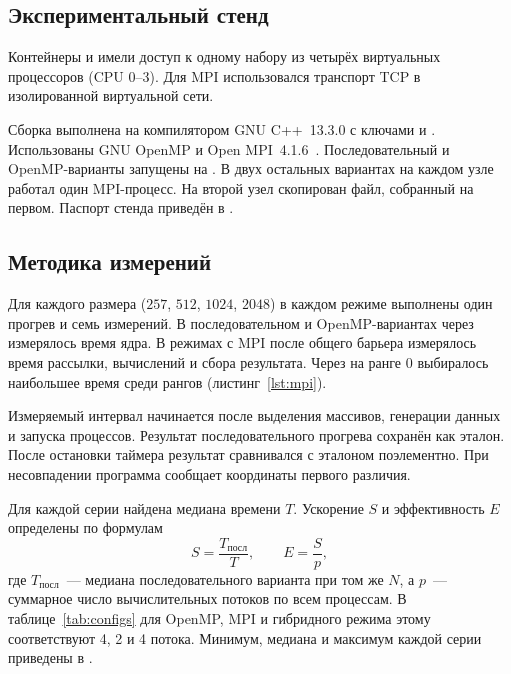 \clearpage
\subsection{Экспериментальный стенд}

Контейнеры  и  имели доступ к одному набору из четырёх виртуальных процессоров (CPU 0--3). Для MPI использовался транспорт TCP в изолированной виртуальной сети.

Сборка выполнена на  компилятором GNU C++~13.3.0 с ключами  и . Использованы GNU OpenMP и Open MPI~4.1.6~\cite{ompi}. Последовательный и OpenMP-варианты запущены на . В двух остальных вариантах на каждом узле работал один MPI-процесс. На второй узел скопирован файл, собранный на первом. Паспорт стенда приведён в .

\subsection{Методика измерений}

Для каждого размера ($257$, $512$, $1024$, $2048$) в каждом режиме выполнены один прогрев и семь измерений. В последовательном и OpenMP-вариантах через  измерялось время ядра. В режимах с MPI после общего барьера измерялось время рассылки, вычислений и сбора результата. Через  на ранге 0 выбиралось наибольшее время среди рангов (листинг~\ref{lst:mpi}).

Измеряемый интервал начинается после выделения массивов, генерации данных и запуска процессов. Результат последовательного прогрева сохранён как эталон. После остановки таймера результат сравнивался с эталоном поэлементно. При несовпадении программа сообщает координаты первого различия.

Для каждой серии найдена медиана времени $T$. Ускорение $S$ и эффективность $E$ определены по формулам
\begin{equation}
S=\frac{T_{\text{посл}}}{T},\qquad E=\frac{S}{p},
\label{eq:metrics}
\end{equation}
где $T_{\text{посл}}$~--- медиана последовательного варианта при том же $N$, а $p$~--- суммарное число вычислительных потоков по всем процессам. В таблице~\ref{tab:configs} для OpenMP, MPI и гибридного режима этому соответствуют 4, 2 и 4 потока. Минимум, медиана и максимум каждой серии приведены в .
